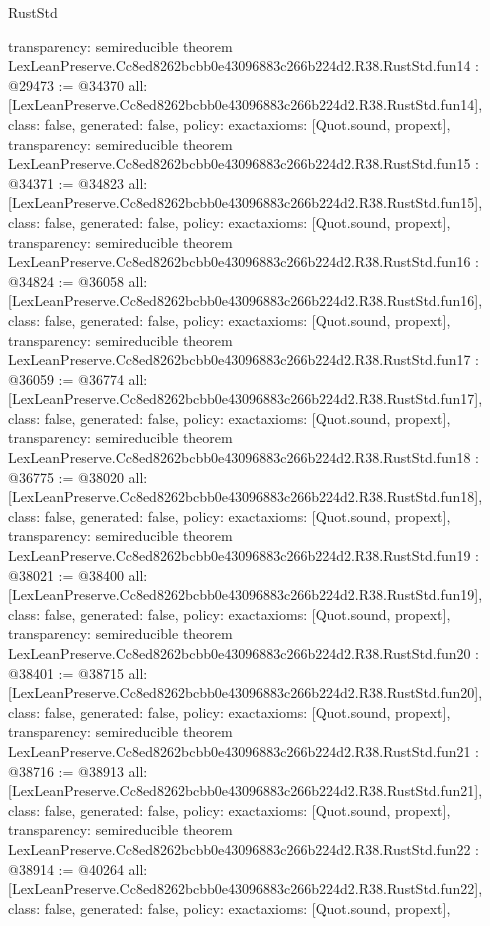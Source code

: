 \begin{lexlean}{RustStd}
\begin{coremodule}
{  transparency: semireducible
}
theorem LexLeanPreserve.Cc8ed8262bcbb0e43096883c266b224d2.R38.RustStd.fun14 : @29473 := @34370 {
  all: [LexLeanPreserve.Cc8ed8262bcbb0e43096883c266b224d2.R38.RustStd.fun14],
  class: false,
  generated: false,
  policy: exact{axioms: [Quot.sound, propext]},
  transparency: semireducible
}
theorem LexLeanPreserve.Cc8ed8262bcbb0e43096883c266b224d2.R38.RustStd.fun15 : @34371 := @34823 {
  all: [LexLeanPreserve.Cc8ed8262bcbb0e43096883c266b224d2.R38.RustStd.fun15],
  class: false,
  generated: false,
  policy: exact{axioms: [Quot.sound, propext]},
  transparency: semireducible
}
theorem LexLeanPreserve.Cc8ed8262bcbb0e43096883c266b224d2.R38.RustStd.fun16 : @34824 := @36058 {
  all: [LexLeanPreserve.Cc8ed8262bcbb0e43096883c266b224d2.R38.RustStd.fun16],
  class: false,
  generated: false,
  policy: exact{axioms: [Quot.sound, propext]},
  transparency: semireducible
}
theorem LexLeanPreserve.Cc8ed8262bcbb0e43096883c266b224d2.R38.RustStd.fun17 : @36059 := @36774 {
  all: [LexLeanPreserve.Cc8ed8262bcbb0e43096883c266b224d2.R38.RustStd.fun17],
  class: false,
  generated: false,
  policy: exact{axioms: [Quot.sound, propext]},
  transparency: semireducible
}
theorem LexLeanPreserve.Cc8ed8262bcbb0e43096883c266b224d2.R38.RustStd.fun18 : @36775 := @38020 {
  all: [LexLeanPreserve.Cc8ed8262bcbb0e43096883c266b224d2.R38.RustStd.fun18],
  class: false,
  generated: false,
  policy: exact{axioms: [Quot.sound, propext]},
  transparency: semireducible
}
theorem LexLeanPreserve.Cc8ed8262bcbb0e43096883c266b224d2.R38.RustStd.fun19 : @38021 := @38400 {
  all: [LexLeanPreserve.Cc8ed8262bcbb0e43096883c266b224d2.R38.RustStd.fun19],
  class: false,
  generated: false,
  policy: exact{axioms: [Quot.sound, propext]},
  transparency: semireducible
}
theorem LexLeanPreserve.Cc8ed8262bcbb0e43096883c266b224d2.R38.RustStd.fun20 : @38401 := @38715 {
  all: [LexLeanPreserve.Cc8ed8262bcbb0e43096883c266b224d2.R38.RustStd.fun20],
  class: false,
  generated: false,
  policy: exact{axioms: [Quot.sound, propext]},
  transparency: semireducible
}
theorem LexLeanPreserve.Cc8ed8262bcbb0e43096883c266b224d2.R38.RustStd.fun21 : @38716 := @38913 {
  all: [LexLeanPreserve.Cc8ed8262bcbb0e43096883c266b224d2.R38.RustStd.fun21],
  class: false,
  generated: false,
  policy: exact{axioms: [Quot.sound, propext]},
  transparency: semireducible
}
theorem LexLeanPreserve.Cc8ed8262bcbb0e43096883c266b224d2.R38.RustStd.fun22 : @38914 := @40264 {
  all: [LexLeanPreserve.Cc8ed8262bcbb0e43096883c266b224d2.R38.RustStd.fun22],
  class: false,
  generated: false,
  policy: exact{axioms: [Quot.sound, propext]},
}
\end{coremodule}
\end{lexlean}
